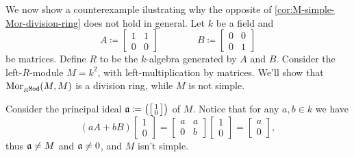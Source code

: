 \begin{example}
    \label{exp:counterexp-schur-opposite}
    We now show a counterexample ilustrating why the opposite of
    \cref{cor:M-simple-Mor-division-ring} does not hold in general. Let \(k\) be a
    field and
    \[
        A \coloneq
        \begin{bmatrix}
            1 & 1 \\
            0 & 0
        \end{bmatrix}
        \qquad \qquad
        B \coloneq
        \begin{bmatrix}
            0 & 0 \\
            0 & 1
        \end{bmatrix}
    \]
    be matrices. Define \(R\) to be the \(k\)-algebra generated by \(A\) and
    \(B\). Consider the left-\(R\)-module \(M = k^2\), with left-multiplication by
    matrices. We'll show that \(\operatorname{Mor}_{{{}_{R}\texttt{Mod}}}(M, M)\) is a division ring, while
    \(M\) is not simple.

    Consider the principal ideal
    \(
    \mathfrak{a} \coloneq \big(\big[
        \begin{smallmatrix}
            1 \\
            0
        \end{smallmatrix}
        \big]\big)\) of \(M\). Notice that for any \(a, b \in k\) we have
    \[
        (a A + b B)
        \begin{bmatrix}
            1 \\
            0
        \end{bmatrix}
        =
        \begin{bmatrix}
            a & a \\
            0 & b
        \end{bmatrix}
        \begin{bmatrix}
            1 \\
            0
        \end{bmatrix}
        =
        \begin{bmatrix}
            a \\
            0
        \end{bmatrix},
    \]
    thus \(\mathfrak{a} \neq M\) and \(\mathfrak{a} \neq 0\), and \(M\) isn't
    simple.


\end{example}
